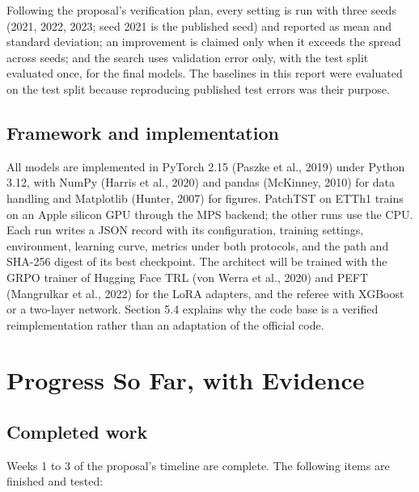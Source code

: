 \documentclass[11pt,letterpaper]{article}
\begin{document}
Following the proposal's verification plan, every setting is run with three seeds (2021, 2022, 2023; seed 2021 is the published seed) and reported as mean and standard deviation; an improvement is claimed only when it exceeds the spread across seeds; and the search uses validation error only, with the test split evaluated once, for the final models. The baselines in this report were evaluated on the test split because reproducing published test errors was their purpose.

\subsection{Framework and implementation}
All models are implemented in PyTorch 2.15 (Paszke et al., 2019) under Python 3.12, with NumPy (Harris et al., 2020) and pandas (McKinney, 2010) for data handling and Matplotlib (Hunter, 2007) for figures. PatchTST on ETTh1 trains on an Apple silicon GPU through the MPS backend; the other runs use the CPU. Each run writes a JSON record with its configuration, training settings, environment, learning curve, metrics under both protocols, and the path and SHA-256 digest of its best checkpoint. The architect will be trained with the GRPO trainer of Hugging Face TRL (von Werra et al., 2020) and PEFT (Mangrulkar et al., 2022) for the LoRA adapters, and the referee with XGBoost or a two-layer network. Section 5.4 explains why the code base is a verified reimplementation rather than an adaptation of the official code.

\section{Progress So Far, with Evidence}
\subsection{Completed work}
Weeks 1 to 3 of the proposal's timeline are complete. The following items are finished and tested:
\end{document}
